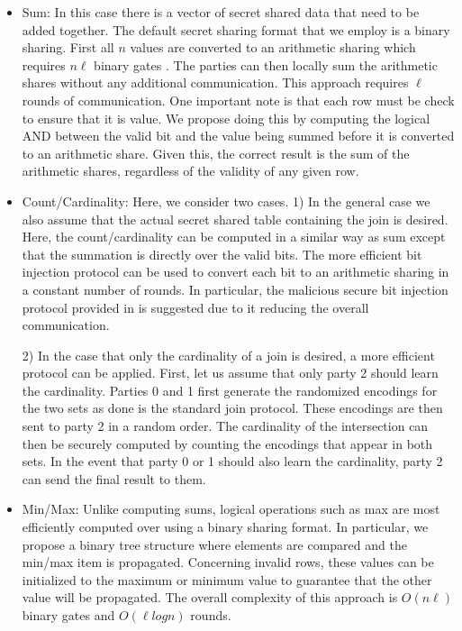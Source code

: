\begin{itemize}
	\item Sum: In this case there is a vector of secret shared data that need to be added together.  The default secret sharing format that we employ is a binary sharing. First all $n$ values are converted to an arithmetic sharing which requires $n\ell$ binary gates \cite{aby3}. The parties can then locally sum the arithmetic shares without any additional communication. This approach requires $\ell$ rounds of communication. One important note is that each row must be check to ensure that it is value. We propose doing this by computing the logical AND between the valid bit and the value being summed before it is converted to an arithmetic share. Given this, the correct result is the sum of the arithmetic shares, regardless of the validity of any given row.
	
	\item Count/Cardinality: Here, we consider two cases. 1) In the general case we also assume that the actual secret shared table containing the join is desired. Here, the count/cardinality can be computed in a similar way as sum except that the summation is directly over the valid bits. The more efficient bit injection protocol\cite{aby3} can be used to convert each bit to an arithmetic sharing in a constant number of rounds. In particular, the malicious secure bit injection protocol provided in \cite{aby3} is suggested due to it reducing the overall communication. 
	
	2) In the case that only the cardinality of a join is desired, a more efficient protocol can be applied. First, let us assume that only party 2 should learn the cardinality. Parties 0 and 1 first generate the randomized encodings for the two sets as done is the standard join protocol. These encodings are then sent to party 2 in a random order. The cardinality of the intersection can then be securely computed by counting the encodings that appear in both sets. In the event that party 0 or 1 should also learn the cardinality, party 2 can send the final result to them. 
	
	\item  Min/Max: Unlike computing sums, logical operations such as max are most efficiently computed over using a binary sharing format. In particular, we propose a binary tree structure where elements are compared and the min/max item is propagated. Concerning invalid rows, these values can be initialized to the maximum or minimum value to guarantee that the other value will be propagated. The overall complexity of this approach is $O(n\ell)$ binary gates and $O(\ell log n)$ rounds.
\end{itemize}

